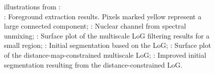 \begin{figure}[h]
%
\caption{%
illustrations from \cite{al2009improved}:\\
: Foreground extraction results. Pixels marked yellow represent a large connected component;
: Nuclear channel from spectral unmixing;
: Surface plot of the multiscale LoG filtering results for a small region;
:  Initial segmentation based on the LoG;
: Surface plot of the distance-map-constrained multiscale LoG;
:  Improved initial segmentation resulting from the distance-constrained LoG.
}
  \label{fig:farsightIllustration}
\end{figure}
\clearpage

